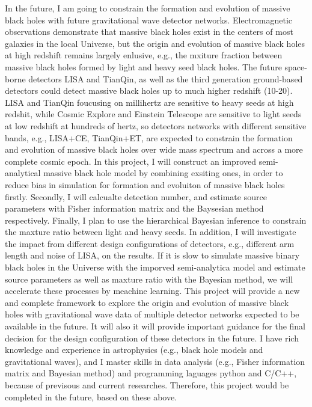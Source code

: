 \documentclass[12pt,a4paper,sans]{article}%
\begin{document}
In the future, I am going to constrain the formation and evolution of massive black holes with future gravitational
wave detector networks. Electromagnetic observations demonstrate that massive black holes exist in the centers of most
galaxies in the local Universe, but the origin and evolution of massive black holes at high redshift remains largely
enlusive, e.g., the mxiture fraction between massive black holes formed by light and heavy seed black holes. The future space-borne detectors LISA and
TianQin, as well as the third generation ground-based detectors could detect massive black holes up to much higher
redshift (10-20). LISA and TianQin foucusing on millihertz are sensitive to heavy seeds at high redshit, while Cosmic
Explore and Einstein Telescope are sensitive to light seeds at low redshift
at hundreds of hertz, so detectors networks with different sensitive bands, e.g., LISA+CE, TianQin+ET, are expected to
constrain the formation and evolution of massive black holes over wide mass spectrum and across a more complete cosmic
epoch. In this project, I will construct an improved semi-analytical massive black hole model by combining
exsiting ones, in order to reduce bias in simulation for formation and evoluiton of massive black holes firstly.
Secondly, I will calcualte detection number, and estimate source parameters with Fisher information matrix and the
Baysesian method respectively. Finally, I plan to use the hierarchical Bayesian inference to constrain the maxture ratio
between light and heavy seeds. In addition, I will investigate the impact from different design configurations of
detectors, e.g., different arm length and noise of LISA, on the results. If it is slow to simulate massive binary black holes in the Universe with the imporved
semi-analytica model and estimate source parameters as well as maxture ratio with the Bayesian method, we will
accelerate these processes by meachine learning. This project will provide a new and complete framework to explore the
origin and evolution of massive black holes with gravitational wave data of multiple detector networks expected to be
available in the future. It will also it will provide important guidance for the final decision for the design configuration of these detectors in the future. I have rich knowledge and experience in astrophysics (e.g., black hole models
and gravitational waves), and I master
skills in data analysis (e.g., Fisher information matrix and Bayesian method) and programming laguages python and C/C++, because of previsous and current
researches. Therefore, this project would be completed in the future, based on these above.  
\end{document}
